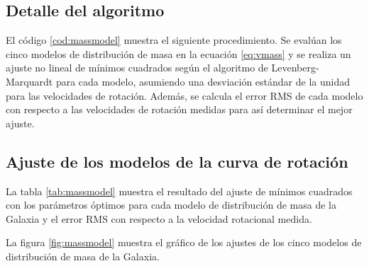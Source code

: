 \subsection{Detalle del algoritmo}

El código \ref{cod:massmodel} muestra el siguiente procedimiento. Se evalúan los cinco modelos de distribución de masa en la ecuación \ref{eq:vmass} y se realiza un ajuste no lineal de mínimos cuadrados según el algoritmo de Levenberg-Marquardt para cada modelo, asumiendo una desviación estándar de la unidad para las velocidades de rotación. Además, se calcula el error RMS de cada modelo con respecto a las velocidades de rotación medidas para así determinar el mejor ajuste.

\subsection{Ajuste de los modelos de la curva de rotación}

La tabla \ref{tab:massmodel} muestra el resultado del ajuste de mínimos cuadrados con los parámetros óptimos para cada modelo de distribución de masa de la Galaxia y el error RMS con respecto a la velocidad rotacional medida.

La figura \ref{fig:massmodel} muestra el gráfico de los ajustes de los cinco modelos de distribución de masa de la Galaxia.

\begin{table}[htpb]
	\centering
	\caption{Parámetros y error obtenido del ajuste no lineal de míminos cuadrados para los modelos de distribución de masa de la Galaxia con respecto a la velocidad rotacional medida.}\label{tab:massmodel}
\end{table}

